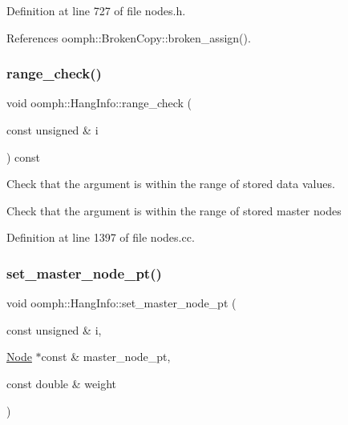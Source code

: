 Definition at line 727 of file nodes.\+h.



References oomph\+::\+Broken\+Copy\+::broken\+\_\+assign().

\mbox{\label{classoomph_1_1HangInfo_a7aaef82d109bb5daed0721402e97afe8}} 
\subsubsection{\texorpdfstring{range\+\_\+check()}{range\_check()}}
{\footnotesize\ttfamily void oomph\+::\+Hang\+Info\+::range\+\_\+check (\begin{DoxyParamCaption}\item[{const unsigned \&}]{i }\end{DoxyParamCaption}) const\hspace{0.3cm}{\ttfamily [private]}}



Check that the argument is within the range of stored data values. 

Check that the argument is within the range of stored master nodes 

Definition at line 1397 of file nodes.\+cc.

\mbox{\label{classoomph_1_1HangInfo_afe4042d5805342d5e12b6a28e376885a}} 
\subsubsection{\texorpdfstring{set\+\_\+master\+\_\+node\+\_\+pt()}{set\_master\_node\_pt()}}
{\footnotesize\ttfamily void oomph\+::\+Hang\+Info\+::set\+\_\+master\+\_\+node\+\_\+pt (\begin{DoxyParamCaption}\item[{const unsigned \&}]{i,  }\item[{\hyperlink{classoomph_1_1Node}{Node} $\ast$const \&}]{master\+\_\+node\+\_\+pt,  }\item[{const double \&}]{weight }\end{DoxyParamCaption})}



